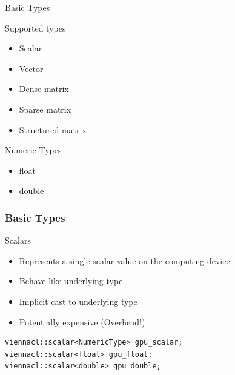 \begin{frame}{Basic Types}

\begin{block}{Supported types}
  \begin{itemize}
   \item Scalar
   \item Vector
   \item Dense matrix
   \item Sparse matrix
   \item Structured matrix
  \end{itemize}
\end{block}

\begin{block}{Numeric Types}
  \begin{itemize}
   \item float
   \item double
  \end{itemize}
\end{block}

\end{frame}



% 
% 



\begin{frame}[fragile]
\frametitle{Basic Types}

\begin{block}{Scalars}  
  \begin{itemize}
   \item Represents a single scalar value on the computing device
   \item Behave like underlying type
   \item Implicit cast to underlying type
   \item Potentially expensive (Overhead!)
  \end{itemize}
  
  \begin{lstlisting}
viennacl::scalar<NumericType> gpu_scalar;
viennacl::scalar<float> gpu_float;
viennacl::scalar<double> gpu_double;
  \end{lstlisting}
\end{block}

\end{frame}



